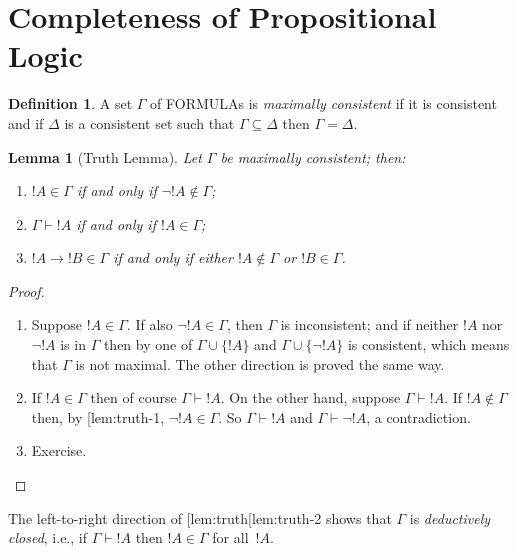 \documentclass[10pt,a4paper]{article}
\makeatletter
\newcommand*{\olup}[1]{\MakeUppercase{#1}}
\theoremstyle{plain}
\newtheorem{lem}[thm]{Lemma}
\theoremstyle{definition}
\newtheorem{defn}[thm]{Definition}
\theoremstyle{remark}
\newcommand*{\olfileid}[3]{}
\newcommand*{\olsection}[1]{\section*{#1}}
\newcommand*{\ollabel}[1]{\label{#1}}
\newcommand{\olref}{\@ifnextchar[{\olref@i}{\olref@final}}
\def\olref@i[#1]{\@ifnextchar[{\olref@ii}{\olref@final}}
\def\olref@ii[#1]{\@ifnextchar[{\olref@iii}{\olref@final}}
\def\olref@iii[#1]{\olref@final}
\def\olref@final#1{\ref{#1}}
\providecommand{\lif}{\mathbin{\rightarrow}}
\providecommand{\Proves}{\mathrel{\vdash}}
\makeatother
\begin{document}



\olfileid{pl}{prp}{com}

\olsection{Completeness of Propositional Logic}

\begin{defn}
\ollabel{def:MaxCon}
A set $\Gamma$ of \olup{formula}s is \emph{maximally consistent} if it is
consistent and if $\Delta$ is a consistent set such that $\Gamma
\subseteq \Delta$ then $\Gamma = \Delta$.
\end{defn}

\begin{lem}[Truth Lemma]
  \ollabel{lem:truth}
Let $\Gamma$ be maximally consistent; then:
\begin{enumerate}
\item \ollabel{lem:truth-1} $!A \in \Gamma$ if and only if $\lnot !A
  \notin \Gamma$;
\item \ollabel{lem:truth-2} $\Gamma \Proves !A$ if and only if $!A \in \Gamma$; 
\item \ollabel{lem:truth-3} $!A \lif !B \in \Gamma$ if and only if
  either $!A \notin \Gamma$ or $!B \in \Gamma$.
\end{enumerate}
\end{lem}

\begin{proof}
\begin{enumerate}
\item Suppose $!A \in \Gamma$. If also $\lnot !A \in \Gamma$, then
  $\Gamma$ is inconsistent; and if neither $!A$ nor $\lnot!A$ is in
  $\Gamma$ then by \olref[axd]{prop:phi} one of $\Gamma\cup\{!A\}$ and
  $\Gamma \cup \{\lnot !A\}$ is consistent, which means that $\Gamma$
  is not maximal. The other direction is proved the same way.
\item If $!A \in \Gamma$ then of course $\Gamma \Proves !A$.  On the
  other hand, suppose $\Gamma \Proves !A$. If $!A \notin \Gamma$ then,
  by \olref{lem:truth-1}, $\lnot !A \in \Gamma$.  So $\Gamma \Proves
  !A$ and $\Gamma \Proves \lnot !A$, a contradiction.
\item Exercise.
\end{enumerate}
\end{proof}

The left-to-right direction of \olref{lem:truth}\olref{lem:truth-2} shows that
$\Gamma$ is \emph{deductively closed}, i.e., if $\Gamma \Proves !A$ then $!A
\in \Gamma$ for all~$!A$.
\end{document}
